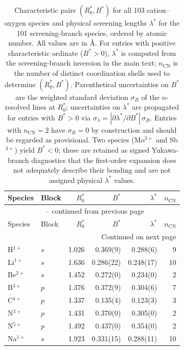 \begin{longtable}{l l r r r r}
\caption{Characteristic pairs $(R_0^*,B^*)$ for all 103 cation--oxygen
species and physical screening lengths $\lambda^*$ for the 101
screening-branch species, ordered by atomic number.  All values are in
\AA.  For entries with positive
characteristic ordinate ($B^*>0$), $\lambda^*$ is
computed from the screening-branch inversion in the main text;
$n_{\mathrm{CN}}$ is the number of distinct coordination shells used to
determine $(R_0^*,B^*)$.
Parenthetical uncertainties on $B^*$ are the weighted standard deviation
$\sigma_B$ of the $n$-resolved lines at $R_0^*$; uncertainties on
$\lambda^*$ are propagated for entries with $B^*>0$ via
$\sigma_\lambda=|\partial\lambda^*/\partial B^*|\,\sigma_B$.
Entries with $n_{\mathrm{CN}}=2$ have $\sigma_B=0$ by construction
and should be regarded as provisional.  Two species (Mo$^{3+}$ and
Sb$^{3+}$) yield $B^*<0$; these are retained as signed
Yukawa-branch diagnostics that the first-order expansion does not
adequately describe their bonding and are not assigned physical
$\lambda^*$ values.}
\label{tab:lambda_star} \\
\hline\hline
  Species & Block & $R_0^*$ & $B^*$ & $\lambda^*$ & $n_{\mathrm{CN}}$ \\
\hline
\endfirsthead
\multicolumn{6}{c}{\tablename\ \thetable{} -- continued from previous page} \\
\hline
  Species & Block & $R_0^*$ & $B^*$ & $\lambda^*$ & $n_{\mathrm{CN}}$ \\
\hline
\endhead
\hline
\multicolumn{6}{r}{Continued on next page} \\
\endfoot
\hline\hline
\endlastfoot
  H$^{1+}$             & $s$   & 1.026 &       0.369(9) &       0.288(6) & 9 \\
  Li$^{1+}$            & $s$   & 1.636 &      0.286(22) &      0.248(17) & 10 \\
  Be$^{2+}$            & $s$   & 1.452 &       0.272(0) &       0.234(0) & 2 \\
  B$^{3+}$             & $p$   & 1.376 &       0.372(9) &       0.304(6) & 7 \\
  C$^{4+}$             & $p$   & 1.337 &       0.135(4) &       0.123(3) & 3 \\
  N$^{3+}$             & $p$   & 1.431 &       0.370(0) &       0.305(0) & 2 \\
  N$^{5+}$             & $p$   & 1.492 &       0.437(0) &       0.354(0) & 2 \\
  Na$^{1+}$            & $s$   & 1.923 &      0.331(15) &      0.288(11) & 10 \\

\end{longtable}

